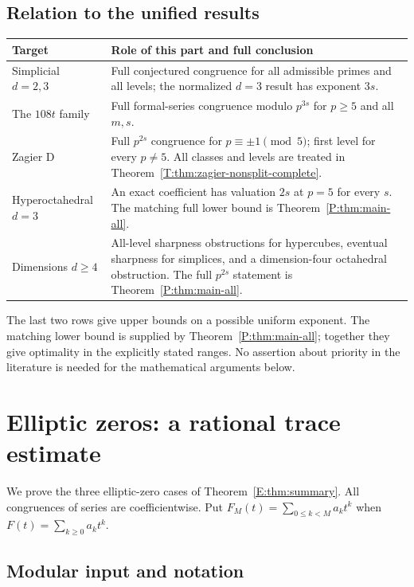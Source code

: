 \documentclass[11pt,a4paper]{article}
\theoremstyle{definition}\newtheorem{definition}[theorem]{Definition}
\theoremstyle{remark}\newtheorem{remark}[theorem]{Remark}
\numberwithin{equation}{section}
\begin{document}
\subsection{Relation to the unified results}

\begin{center}\small
\begin{tabular}{@{}p{}p{}@{}}
\toprule
Target&Role of this part and full conclusion\\ \midrule
Simplicial $d=2,3$&Full conjectured congruence for all admissible primes and all levels; the normalized $d=3$ result has exponent $3s$.\\[3pt]
The $108t$ family&Full formal-series congruence modulo $p^{3s}$ for $p\geq5$ and all $m,s$.\\[3pt]
Zagier D&Full $p^{2s}$ congruence for $p\equiv\pm1\pmod5$; first level for every $p\ne5$.  All classes and levels are treated in Theorem~\ref{T:thm:zagier-nonsplit-complete}.\\[3pt]
Hyperoctahedral $d=3$&An exact coefficient has valuation $2s$ at $p=5$ for every $s$.  The matching full lower bound is Theorem~\ref{P:thm:main-all}.\\[3pt]
Dimensions $d\geq4$&All-level sharpness obstructions for hypercubes, eventual sharpness for simplices, and a dimension-four octahedral obstruction.  The full $p^{2s}$ statement is Theorem~\ref{P:thm:main-all}.\\
\bottomrule
\end{tabular}
\end{center}

The last two rows give upper bounds on a possible uniform exponent.
The matching lower bound is supplied by Theorem~\ref{P:thm:main-all}; together they give optimality in the explicitly stated ranges.
No assertion about priority in the literature is needed for the
mathematical arguments below.

\section{Elliptic zeros: a rational trace estimate}\label{E:source-main-2}\label{E:sec:elliptic}

We prove the three elliptic-zero cases of Theorem~\ref{E:thm:summary}.
All congruences of series are coefficientwise.
Put $F_M(t)=\sum_{0\leq k<M}a_kt^k$ when $F(t)=\sum_{k\geq0}a_kt^k$.

\subsection{Modular input and notation}
\end{document}
